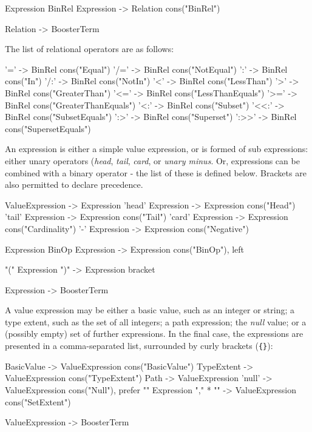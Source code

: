 \begin{code}
Expression BinRel Expression -> Relation {cons("BinRel")}

Relation -> BoosterTerm
\end{code}  

The list of relational operators are as follows:	 

\begin{code}
'=' 	-> BinRel {cons("Equal")}
'/=' 	-> BinRel {cons("NotEqual")}
':' 	-> BinRel {cons("In")}
'/:' 	-> BinRel {cons("NotIn")}
'<' 	-> BinRel {cons("LessThan")}
'>' 	-> BinRel {cons("GreaterThan")}
'<=' 	-> BinRel {cons("LessThanEquals")}
'>=' 	-> BinRel {cons("GreaterThanEquals")}
'<:' 	-> BinRel {cons("Subset")}
'<<:' 	-> BinRel {cons("SubsetEquals")}
':>' 	-> BinRel {cons("Superset")}
':>>' 	-> BinRel {cons("SupersetEquals")}
\end{code}
    
An expression is either a simple value expression, or is formed of sub
expressions: either unary operators (\emph{head}, \emph{tail},
\emph{card}, or \emph{unary minus}.  Or, expressions can be combined
with a binary operator - the list of these is defined below.  Brackets
are also permitted to declare precedence.

\begin{code}    
ValueExpression 	-> Expression
'head' Expression	-> Expression {cons("Head")}
'tail' Expression 	-> Expression {cons("Tail")}
'card' Expression 	-> Expression {cons("Cardinality")}
'-' Expression 		-> Expression {cons("Negative")}

Expression BinOp Expression -> Expression {cons("BinOp"), left}

"(" Expression ")" 	-> Expression {bracket}

Expression -> BoosterTerm
\end{code}

A value expression may be either a basic value, such as an integer or
string; a type extent, such as the set of all integers; a path
expression; the \emph{null} value; or a (possibly empty) set of
further expressions.  In the final case, the expressions are presented
in a comma-separated list, surrounded by curly brackets (\verb|{}|):

\begin{code}
BasicValue                 -> ValueExpression {cons("BasicValue")}
TypeExtent                 -> ValueExpression {cons("TypeExtent")}
Path		           -> ValueExpression {} 
'null'		           -> ValueExpression {cons("Null"), prefer}
"{" {Expression "," }* "}" -> ValueExpression {cons("SetExtent")}

ValueExpression -> BoosterTerm
\end{code}

